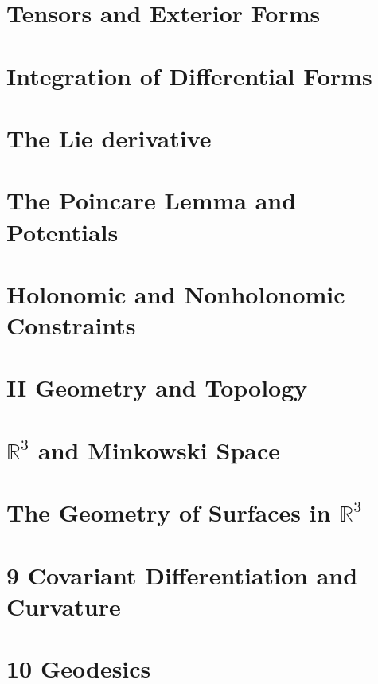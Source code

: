                                                                  
\section{Tensors and Exterior Forms}
		

\section{Integration of Differential Forms}
		

\section{The Lie derivative}
		

\section{The Poincare Lemma and Potentials}
		

\section{Holonomic and Nonholonomic Constraints}

\section*{II Geometry and Topology}

\section{$\mathbb R^3$ and Minkowski Space}
		

\section{The Geometry of Surfaces in $\mathbb{R}^3$}

\section{9 Covariant Differentiation and Curvature}
		

\section{10 Geodesics}

